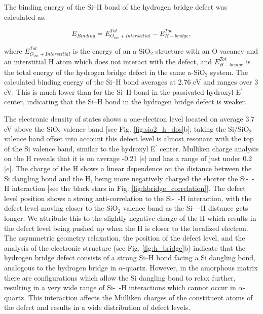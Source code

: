 \documentclass[aps,prb,reprint,superscriptaddress,showpacs]{revtex4-1}
\begin{document}
The binding energy of the \mbox{Si--H} bond of the hydrogen bridge defect was calculated as:

\begin{equation}
E_{Binding}=E^{Tot}_{O_{vac} + Interstitial}-E^{Tot}_{H-bridge},
\end{equation}

where $E^{Tot}_{O_{vac} + Interstitial}$ is the energy of an a-SiO$_2$ structure with an O vacancy and an interstitial H atom which does not interact with the defect, and $E^{Tot}_{H-bridge}$ is the total energy of the hydrogen bridge defect in the same a-SiO$_2$ system. The calculated binding energy of the \mbox{Si--H} bond averages at 2.76 eV and ranges over 3 eV. This is much lower than for the \mbox{Si--H} bond in the passivated hydroxyl E$^\prime$ center, indicating that the \mbox{Si--H} bond in the hydrogen bridge defect is weaker.


The electronic density of states shows a one-electron level located on average 3.7 eV above the SiO$_2$ valence band [see Fig. \ref{fig:sio2_h_dos}b]; taking the Si/SiO$_2$ valence band offset into account this defect level is almost resonant with the top of the Si valence band, similar to the hydroxyl E$^\prime$ center. Mulliken charge analysis on the H reveals that it is on average -0.21 $|e|$ and has a range of just under 0.2 $|e|$. The charge of the H shows a linear dependence on the distance between the Si dangling bond and the H, being more negatively charged the shorter the \mbox{Si- -H} interaction [see the black stars in Fig. \ref{fig:hbridge_correlation}]. The defect level position shows a strong anti-correlation to the \mbox{Si- -H} interaction, with the defect level moving closer to the SiO$_2$ valence band as the \mbox{Si- -H} distance gets longer. We attribute this to the slightly negative charge of the H which results in the defect level being pushed up when the H is closer to the localized electron. The asymmetric geometry relaxation, the position of the defect level, and the analysis of the electronic structure (see Fig. \ref{fig:h_bridge}b) indicate that the hydrogen bridge defect consists of a strong \mbox{Si--H} bond facing a Si dangling bond, analogous to the hydrogen bridge in $\alpha$-quartz. However, in the amorphous matrix there are configurations which allow the Si dangling bond to relax further, resulting in a very wide range of \mbox{Si- -H} interactions which cannot occur in $\alpha$-quartz. This interaction affects the Mulliken charges of the constituent atoms of the defect and results in a wide distribution of defect levels.
\end{document}
